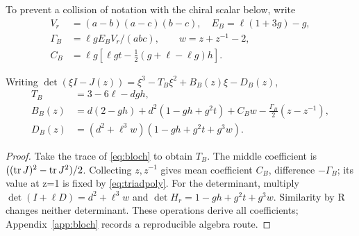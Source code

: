 To prevent a collision of notation with the chiral scalar below, write
\begin{align}
V_r&=(a-b)(a-c)(b-c),\quad E_B=\ell(1+3g)-g,\\
\Gamma_B&=\ell gE_B V_r/(abc),\qquad w=z+z^{-1}-2,\\
C_B&=\ell g\left[\ell gt-\tfrac12(g+\ell-\ell g)h\right].
\end{align}
\begin{proposition}\label{prop:blochpoly}
Writing \(\det(\xi I-J(z))=\xi^3-T_B\xi^2+B_B(z)\xi-D_B(z)\),
\begin{align}
T_B&=3-6\ell-dgh,\label{eq:BT}\\
B_B(z)&=d(2-gh)+d^2(1-gh+g^2t)+C_Bw-\frac{\Gamma_B}{2}(z-z^{-1}),\label{eq:BB}\\
D_B(z)&=(d^2+\ell^3w)(1-gh+g^2t+g^3w).\label{eq:BD}
\end{align}
\end{proposition}
\begin{proof}
Take the trace of \eqref{eq:bloch} to obtain \(T_B\). The middle coefficient is \(((\operatorname{tr} J)^2-\operatorname{tr} J^2)/2\). Collecting \(z,z^{-1}\) gives mean coefficient \(C_B\), difference \(-\Gamma_B\); its value at z=1 is fixed by \eqref{eq:triadpoly}. For the determinant, multiply
\(\det(I+\ell D)=d^2+\ell^3w\) and
\(\det H_r=1-gh+g^2t+g^3w\).
Similarity by R changes neither determinant. These operations derive all coefficients; Appendix~\ref{app:bloch} records a reproducible algebra route.
\end{proof}

